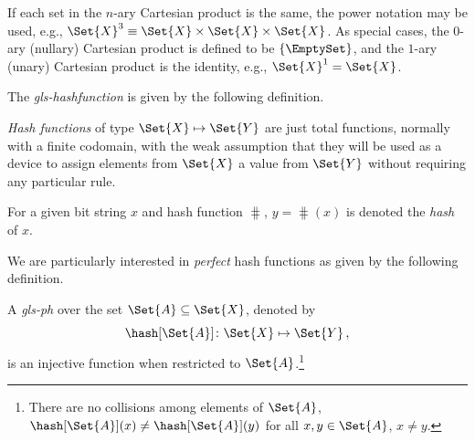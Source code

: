 \documentclass[ ../main.tex]{subfiles}
\begin{document}
If each set in the $n$-ary Cartesian product is the same, the power notation may be used, e.g., $\Set{X}^3 \equiv \Set{X} \times \Set{X} \times \Set{X}$.
As special cases, the $0$-ary (nullary) Cartesian product is defined to be $\{ \EmptySet \}$, and the $1$-ary (unary) Cartesian product is the identity, e.g., $\Set{X}^1 = \Set{X}$.






The \emph{\gls{gls-hashfunction}} is given by the following definition.
\begin{definition}
\emph{Hash functions} of type $\Set{X} \mapsto \Set{Y}$ are just total functions, normally with a finite codomain, with the weak assumption that they will be used as a device to assign elements from $\Set{X}$ a value from $\Set{Y}$ without requiring any particular rule.
\end{definition}
For a given bit string $x$ and hash function $\hash$, $y = \hash(x)$ is denoted the \emph{hash} of $x$.

We are particularly interested in \emph{perfect} hash functions as given by the following definition.
\begin{definition}
A \emph{\gls{gls-ph}} over the set $\Set{A} \subseteq \Set{X}$, denoted by
\begin{equation}
    \hash[\Set{A}] \colon \Set{X} \mapsto \Set{Y}\,,
\end{equation}
is an injective function when restricted to $\Set{A}$.\footnote{There are no collisions among elements of $\Set{A}$, $\hash[\Set{A}](x) \neq \hash[\Set{A}](y)$ for all $x, y \in \Set{A}$, $x \neq y$.}
\end{definition}
\end{document}
